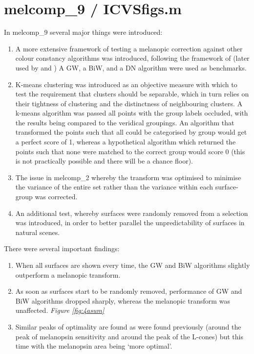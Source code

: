 \section{melcomp\_9 / ICVSfigs.m}

In melcomp\_9 several major things were introduced:

\begin{enumerate}
    \item A more extensive framework of testing a melanopic correction against other colour constancy algorithms was introduced, following the framework of \citet{barnard_comparison_2002} (later used by \citet{hordley_reevaluation_2006} and \citet{gijsenij_computational_2011}) A \gls{GW}, a \gls{BiW}, and a \gls{DN} algorithm were used as benchmarks.
    \item K-means clustering was introduced as an objective measure with which to test the requirement that clusters should be separable, which in turn relies on their tightness of clustering and the distinctness of neighbouring clusters. A k-means algorithm was passed all points with the group labels occluded, with the results being compared to the veridical groupings. An algorithm that transformed the points such that all could be categorised by group would get a perfect score of 1, whereas a hypothetical algorithm which returned the points such that none were matched to the correct group would score 0 (this is not practically possible and there will be a chance floor).
    \item The issue in melcomp\_2 whereby the transform was optimised to minimise the variance of the entire set rather than the variance within each surface-group was corrected.
    \item An additional test, whereby surfaces were randomly removed from a selection was introduced, in order to better parallel the unpredictability of surfaces in natural scenes.
\end{enumerate}

There were several important findings:

\begin{enumerate}
    \item When all surfaces are shown every time, the \gls{GW} and \gls{BiW} algorithms slightly outperform a melanopic transform.
    \item As soon as surfaces start to be randomly removed, performance of \gls{GW} and \gls{BiW} algorithms dropped sharply, whereas the melanopic transform was unaffected. \emph{Figure \ref{fig:4asum}}
    \item Similar peaks of optimality are found as were found previously (around the peak of melanopsin sensitivity and around the peak of the L-cones) but this time with the melanopsin area being `more optimal'.
\end{enumerate}

